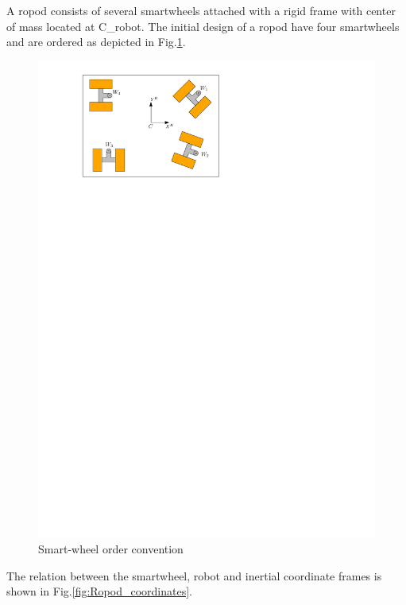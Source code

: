 \documentclass{article}
\begin{document}
A \gls{ropod} consists of several \gls{smartwheel}s attached with a rigid frame with center of mass located at \gls{C_robot}. The initial design of a \gls{ropod} have four \gls{smartwheel}s and are ordered as depicted in Fig.\ref{fig:Smartwheel_ord}. 

	\begin{figure}[h]
		\centering
		\includegraphics[]{Ropod_wheelorder.pdf}
		\caption{Smart-wheel order convention}
		\label{fig:Smartwheel_ord}
	\end{figure}

The relation between the \gls{smartwheel}, robot and inertial coordinate frames is shown in Fig.\ref{fig:Ropod_coordinates}. 
\end{document}
